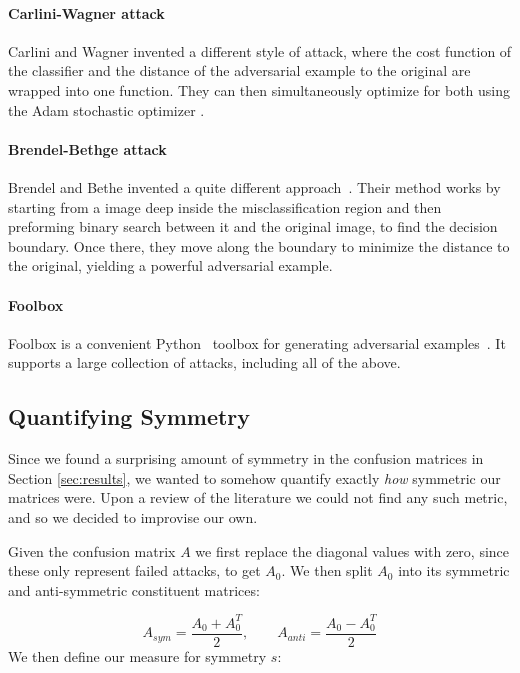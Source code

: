 \documentclass{article}
\begin{document}
\paragraph{Carlini-Wagner attack}
Carlini and Wagner \cite{carlini2017towards} invented a different style of attack, where the cost function of the classifier and the distance of the adversarial example to the original are wrapped into one function. They can then simultaneously optimize for both using the Adam stochastic optimizer \cite{kingma2017adam}.

\paragraph{Brendel-Bethge attack}
Brendel and Bethe invented a quite different approach~\cite{brendel2019accurate}.
Their method works by starting from a image deep inside the misclassification region and then preforming binary search between it and the original image, to find the decision boundary. Once there, they move along the boundary to minimize the distance to the original, yielding a powerful adversarial example.

\paragraph{Foolbox}
Foolbox is a convenient Python~\cite{van1995python} toolbox for generating adversarial examples~\cite{rauber2017foolbox}. It supports a large collection of attacks, including all of the above.

\subsection{Quantifying Symmetry}

Since we found a surprising amount of symmetry in the confusion matrices in Section \ref{sec:results}, we wanted to somehow quantify exactly \textit{how} symmetric our matrices were. Upon a review of the literature we could not find any such metric, and so we decided to improvise our own.

Given the confusion matrix $A$ we first replace the diagonal values with zero, since these only represent failed attacks, to get $A_0$. We then split $A_0$ into its symmetric and anti-symmetric constituent matrices:

\begin{equation}
	A_{sym} = \frac{A_0 + A_0^T}{2}, \qquad
	A_{anti} = \frac{A_0 - A_0^T}{2}
\end{equation}
We then define our measure for symmetry $s$:
\end{document}
